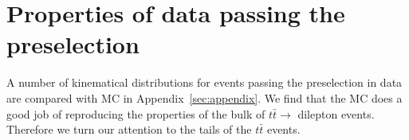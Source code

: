 \section{Properties of data passing the preselection}
\label{sec:bulk}
A number of kinematical distributions for events passing 
the preselection in data are compared with MC in 
Appendix~\ref{sec:appendix}.  We find that
the MC does a good job of reproducing the properties of 
the bulk of $t\bar{t} \to $ dilepton events.  Therefore
we turn our attention to the tails of the $t\bar{t}$ 
events. 